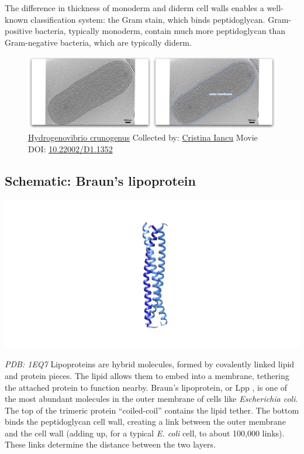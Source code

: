 \documentclass[]{tufte-book}
\begin{document}
The difference in thickness of monoderm and diderm cell walls enables a
well-known classification system: the Gram stain, which binds
peptidoglycan. Gram-positive bacteria, typically monoderm, contain much
more peptidoglycan than Gram-negative bacteria, which are typically
diderm.





\begin{figure}
\includegraphics{movie_stills/2_3} \caption[\protect\hyperlink{tree}{Hydrogenovibrio crunogenus} Collected
by: \protect\hyperlink{cristina_iancu}{Cristina Iancu} Movie DOI:
\href{https://doi.org/10.22002/D1.1352}{10.22002/D1.1352}]{\protect\hyperlink{tree}{Hydrogenovibrio crunogenus} Collected
by: \protect\hyperlink{cristina_iancu}{Cristina Iancu} Movie DOI:
\href{https://doi.org/10.22002/D1.1352}{10.22002/D1.1352}}\label{fig:2-3}
\end{figure}

\hypertarget{Brauns_lipoprotein}{\subsection*{Schematic: Braun's
lipoprotein}\label{Brauns_lipoprotein}}

\includegraphics{img/schematics/2_3_1}

\emph{PDB: 1EQ7} Lipoproteins are hybrid molecules, formed by covalently
linked lipid and protein pieces. The lipid allows them to embed into a
membrane, tethering the attached protein to function nearby. Braun's
lipoprotein, or Lpp \citep{shu2000}, is one of the most abundant
molecules in the outer membrane of cells like \emph{Escherichia coli}.
The top of the trimeric protein ``coiled-coil'' contains the lipid
tether. The bottom binds the peptidoglycan cell wall, creating a link
between the outer membrane and the cell wall (adding up, for a typical
\emph{E. coli} cell, to about 100,000 links). These links determine the
distance between the two layers.
\end{document}

